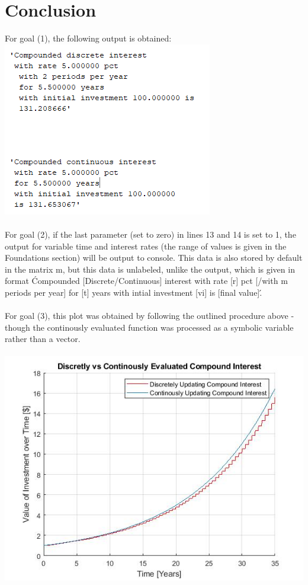 \documentclass[10pt]{report}
\begin{document}
    \section*{Conclusion}
    For goal (1), the following output is obtained:\\
    \includegraphics[width=\textwidth]{capture.PNG}\\\\
    For goal (2), if the last parameter (set to zero) in lines 13 and 14 is set to 1, the output for variable time and interest rates   (the range of values is given in the Foundations section) will be output to console. This data is also stored by default in the matrix m, but this data is unlabeled, unlike the output, which is given in format \'Compounded [Discrete/Continuous] interest with rate [r] pct [/with m periods per year] for [t] years with intial investment [vi] is  [final value]\'. \\\\
    For goal (3), this plot was obtained by following the outlined procedure above - though the continously evaluated function was processed as a symbolic variable rather than a vector. \\\\
    \includegraphics[width=\textwidth]{graph_final_2d.jpg}
\end{document}

